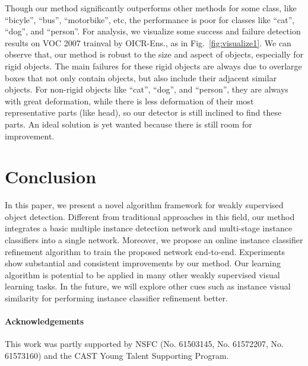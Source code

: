 \documentclass[10pt,twocolumn,letterpaper]{article}
\def\methodname{OICR}
\begin{document}
Though our method significantly outperforms other methods for some class, like ``bicyle'', ``bus'', ``motorbike'', etc, the performance is poor for classes like ``cat'', ``dog'', and ``person''.
For analysis, we visualize some success and failure detection results on VOC 2007 trainval by \methodname-Ens., as in Fig.~\ref{fig:visualize1}.
We can observe that, our method is robust to the size and aspect of objects, especially for rigid objects.
The main failures for these rigid objects are always due to overlarge boxes that not only contain objects, but also include their adjacent similar objects.
For non-rigid objects like ``cat'', ``dog'', and ``person'', they are always with great deformation, while there is less deformation of their most representative parts (like head), so our detector is still inclined to find these parts.
An ideal solution is yet wanted because there is still room for improvement.


\section{Conclusion}
\label{sec:con}

In this paper, we present a novel algorithm framework for weakly supervised object detection.
Different from traditional approaches in this field, our method integrates a basic multiple instance detection network and multi-stage instance classifiers into a single network.
Moreover, we propose an online instance classifier refinement algorithm to train the proposed network end-to-end.
Experiments show substantial and consistent improvements by our method.
Our learning algorithm is potential to be applied in many other weakly supervised visual learning tasks.
In the future, we will explore other cues such as instance visual similarity for performing instance classifier refinement better.


\paragraph{Acknowledgements}
This work was partly supported by NSFC (No. 61503145, No. 61572207, No. 61573160) and the CAST Young Talent Supporting Program.


{\small


}



\clearpage
\renewcommand{\figurename}{Supplementary Figure}
\renewcommand{\tablename}{Supplementary Table}
\setcounter{section}{0}
\setcounter{figure}{0}
\setcounter{table}{0}
\end{document}
